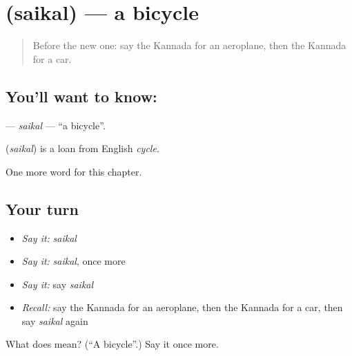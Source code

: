 \section[\texorpdfstring{\kn{ಸೈಕಲ್} (saikal)}{ಸೈಕಲ್ (saikal)}]{ (saikal) — a bicycle}

\label{lesson:KA-C111-saikal}



\begin{quote}
Before the new one: say the Kannada for an aeroplane, then the Kannada for a car.
\end{quote}

\subsection*{You'll want to know: }
\textbf{} — \emph{saikal} — \textquotedblleft{}a bicycle\textquotedblright{}.

\begin{cousinweb}
\textbf{} (\emph{saikal}) is a loan from English \emph{cycle}.
\end{cousinweb}

\begin{grammarlens}[title={What you've built}]
One more word for this chapter.
\end{grammarlens}

\subsection*{Your turn}
\begin{itemize}
\raggedright
  \item \emph{Say it:} \emph{saikal}
  \item \emph{Say it:} \emph{saikal}, once more
  \item \emph{Say it:} say \emph{saikal}
  \item \emph{Recall:} say the Kannada for an aeroplane, then the Kannada for a car, then say \emph{saikal} again
\end{itemize}

\begin{tcolorbox}[breakable,colback=teal!4,colframe=teal!35!black,title={Before you move on}]
What does  mean? (\textquotedblleft{}A bicycle\textquotedblright{}.) Say it once more.
\end{tcolorbox}
